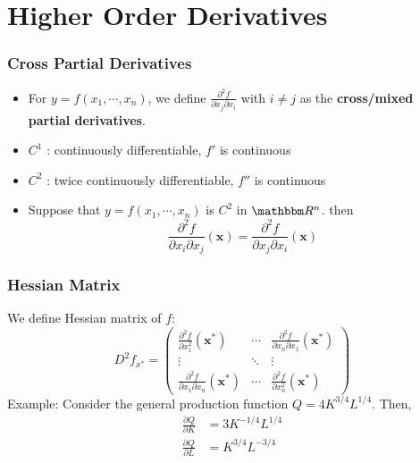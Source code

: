 \documentclass[9pt,aspectratio=169]{beamer}
\newcommand{\RR}{\mathbbm R}
\begin{document}
\section{Higher Order Derivatives}
\begin{frame}
	\frametitle{Cross Partial Derivatives}
	\begin{itemize}
		\item For $ y = f(x_1,\cdots,x_n)$, we define $\frac{\partial^2
          f}{\partial x_j\partial x_i}$ with $i\neq j$ as the
        \textbf{cross/mixed partial derivatives}.
		\item $C^1$ : continuously differentiable, $f'$ is continuous
		\item $C^2$ : twice continuously differentiable, $f''$ is continuous
		\item Suppose that $y = f(x_1,\cdots, x_n)$ is $C^2$ in $\RR^n$.
        then
        $$\frac{\partial^2 f}{\partial x_i\partial x_j}(\mathbf{x}) =
        \frac{\partial^2 f}{\partial x_j\partial x_i}(\mathbf{x})$$
	\end{itemize}
\end{frame}

\begin{frame}
	\frametitle{Hessian Matrix}
	We define Hessian matrix of $f$:
	$$D^2f_{x^*} = 	 \left(\begin{array}{ccc}
            \frac{\partial^2 f}{\partial x_1^2}(\mathbf{x^*}) & \cdots &
            \frac{\partial^2 f}{\partial x_n\partial x_1}(\mathbf{x^*}) \\
            \vdots & \ddots & \vdots \\
            \frac{\partial^2 f}{\partial x_1\partial x_n}(\mathbf{x^*})& \cdots &
            \frac{\partial^2 f}{\partial x_n^2}(\mathbf{x^*})
	\end{array}
	\right)$$
	Example: Consider the general production function $Q = 4K^{3/4}L^{1/4}$. Then,
	\begin{align}
	\frac{\partial Q}{\partial K} &= 3K^{-1/4}L^{1/4} \nonumber \\
	\frac{\partial Q}{\partial L} &= K^{3/4}L^{-3/4} \nonumber 
	\end{align}
\end{frame}
\end{document}
